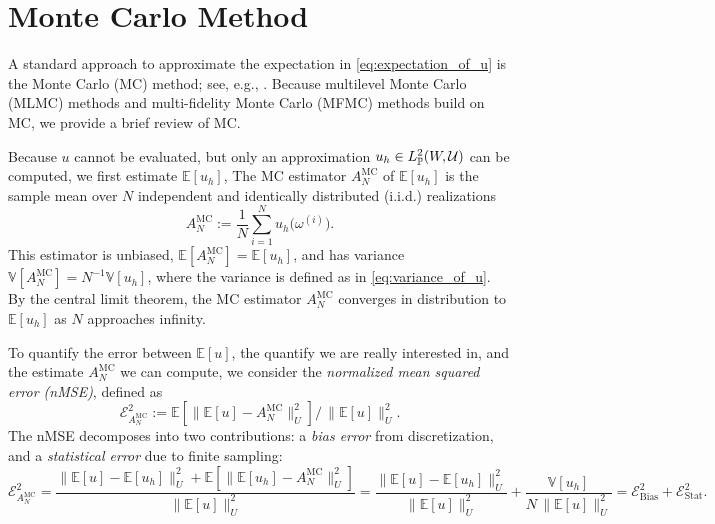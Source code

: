 
\section{Monte Carlo Method}\label{sec:MC}

A standard approach to approximate the expectation in \eqref{eq:expectation_of_u} is the Monte Carlo (MC) method; 
see, e.g.,  \cite{MBGiles_2015a,MDGunzburger_CGWebster_GZhang_2014a}.
Because multilevel Monte Carlo (MLMC) methods \cite{MBGiles_2015a,SHeinrich_2001a} and 
multi-fidelity Monte Carlo (MFMC) methods  \cite{BPeherstorfer_KWillcox_MDGunzburger_2016a, BPeherstorfer_KWillcox_MDGunzburger_2018a} 
build on MC, we provide a brief review of MC.


Because $u$ cannot be evaluated, but only an approximation $u_h \in   L_{\mathbb{P}}^2(W, \mathcal{U})$ can be 
computed, we first estimate $\mathbb{E}[u_h ]$, 
The MC estimator $A^{\text{MC}}_{N}$ of $\mathbb{E}[u_h ]$ 
is the sample mean over $N$ independent and identically distributed (i.i.d.) realizations 
\begin{equation}\label{eq:MC_estimator}
    A^{\text{MC}}_{N} := \frac{1}{N}\sum_{i=1}^{N} u_h \big(\omega^{(i)} \big).
\end{equation}
%
This estimator is unbiased,  $\mathbb{E}[A^{\text{MC}}_{N}] = \mathbb{E}[u_h ]$, 
and has variance $\mathbb{V}[A^{\text{MC}}_{N}] = N^{-1} \mathbb{V}[u_h ]$, 
where the variance is defined as in \eqref{eq:variance_of_u}.
By the central limit theorem, the MC estimator $A^{\text{MC}}_{N}$ converges in distribution to $\mathbb{E}[u_h]$ as $N$ approaches infinity. 

To quantify the error between $\mathbb{E}[u]$, the quantify we are really interested in, and the estimate $A^{\text{MC}}_{N}$ we can compute,
we consider the  {\it normalized mean squared error (nMSE)}, defined as
 \[
             \mathcal{E}_{A^{\text{MC}}_{N}}^2:= \mathbb E\left[ \big\| \mathbb{E}[u]-A^{\text{MC}}_{N}  \big\| _{U}^2\right]  
                                                                           \big/ \, \big\| \mathbb{E}[u]  \big\| _{U}^2.
\] 
The nMSE decomposes into two contributions: a {\it bias error} from  discretization, and a {\it statistical error} due to finite sampling:
%
\[
\mathcal{E}_{A^{\text{MC}}_{N}}^2 
= \frac{ \big\| \mathbb{E}[u]-\mathbb{E}[u_h ]  \big\| _{U}^2
               +\mathbb E\left[ \big\|  \mathbb{E}[u_h ] -A^{\text{MC}}_{N}  \big\| _{U}^2\right]}{ \big\| \mathbb{E}[u]  \big\| _{U}^2} 
= \frac{ \big\| \mathbb{E}[u]-\mathbb{E}[u_h ]  \big\| _{U}^2}{ \big\| \mathbb{E}[u]  \big\| _{U}^2}
    +\frac{\mathbb{V}\left[u_h \right]} {N \, \big\| \mathbb{E}[u]  \big\| _{U}^2}
=\mathcal{E}_{\text{Bias}}^2 + \mathcal{E}_{\text{Stat}}^2.
\]


